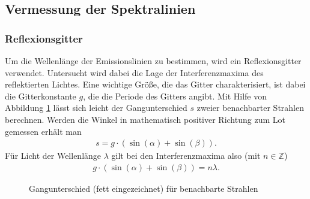 \subsection{Vermessung der Spektralinien}
\label{subsec:auswertung_spektrallinien}
\subsubsection{Reflexionsgitter}
Um die Wellenlänge der Emissionslinien zu bestimmen, wird ein Reflexionsgitter verwendet. Untersucht wird dabei die Lage der Interferenzmaxima des reflektierten Lichtes. Eine wichtige Größe, die das Gitter charakterisiert, ist dabei die Gitterkonstante $g$, die die Periode des Gitters angibt. Mit Hilfe von Abbildung \ref{Gangunterschied} lässt sich leicht der Gangunterschied $s$ zweier benachbarter Strahlen berechnen. Werden die Winkel in mathematisch positiver Richtung zum Lot gemessen erhält man
\begin{align*}
  s=g \cdot (\sin(\alpha)+\sin(\beta)).
\end{align*} 
Für Licht der Wellenlänge $\lambda$ gilt bei den Interferenzmaxima also (mit $n \in \mathbb{Z}$)
\begin{align}
  g \cdot (\sin(\alpha)+\sin(\beta)) = n\lambda.
  \label{equ:gitter}
\end{align}
\begin{figure}[h]
  \centering
  \caption{Gangunterschied (fett eingezeichnet) für benachbarte Strahlen}
  \label{Gangunterschied}
\end{figure}

